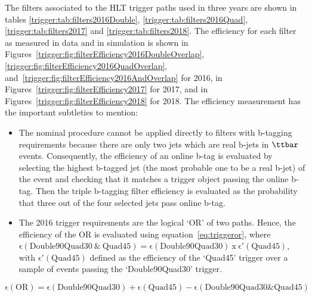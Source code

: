 The filters associated to the HLT trigger paths used in three years are shown in tables \ref{trigger:tab:filters2016Double}, \ref{trigger:tab:filters2016Quad}, \ref{trigger:tab:filters2017} and \ref{trigger:tab:filters2018}. The efficiency for each filter as measured in data and in simulation is shown in Figures~\ref{trigger:fig:filterEfficiency2016DoubleOverlap}, \ref{trigger:fig:filterEfficiency2016QuadOverlap}, and~\ref{trigger:fig:filterEfficiency2016AndOverlap} for 2016, in Figures~\ref{trigger:fig:filterEfficiency2017} for 2017, and in Figures~\ref{trigger:fig:filterEfficiency2018} for 2018. The efficiency measurement has the important subtleties to mention: 
\begin{itemize}
    \item The nominal procedure cannot be applied directly to filters with b-tagging requirements because there are only two jets which are real b-jets in $\ttbar$ events. Consequently, the efficiency of an online b-tag is evaluated by selecting the highest b-tagged jet (the most probable one to be a real b-jet) of the event and checking that it matches a trigger object passing the online b-tag. Then the triple b-tagging filter efficiency is evaluated as the probability that three out of the four selected jets pass online b-tag.
    \item  The 2016 trigger requirements are the logical `OR' of two paths. Hence, the efficiency of the OR is evaluated using equation~\ref{eq:triggeror}, where $\mathrm{\epsilon(Double90Quad30~\&~Quad45) = \epsilon(Double90Quad30)~x~\epsilon'(Quad45)}$, with $\mathrm{\epsilon'(Quad45)}$ defined as the efficiency of the `Quad45' trigger over a sample of events passing the `Double90Quad30' trigger.
\end{itemize}
\begin{equation} 
\mathrm{\epsilon (OR) = \epsilon(Double90Quad30) + \epsilon(Quad45) - \epsilon(Double90Quad30 \& Quad45)}
\label{eq:triggeror}
\end{equation}

